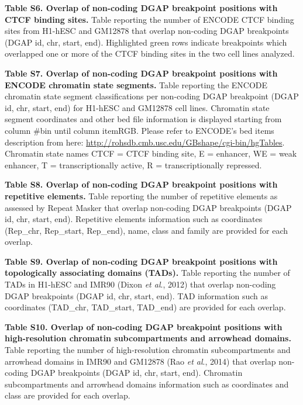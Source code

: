 \documentclass[a4paper,twoside=true,openright,parskip=full,chapterprefix=true,11pt,headings=normal,bibliography=totoc,listof=totoc,titlepage=on,captions=tableabove,draft=false]{scrreprt}
\theoremstyle{definition}
\theoremstyle{definition}
\theoremstyle{definition}
\theoremstyle{remark}
\begin{document}
\textbf{Table S6. Overlap of non-coding DGAP breakpoint positions with
CTCF binding sites.} Table reporting the number of ENCODE CTCF binding
sites from H1-hESC and GM12878 that overlap non-coding DGAP breakpoints
(DGAP id, chr, start, end). Highlighted green rows indicate breakpoints
which overlapped one or more of the CTCF binding sites in the two cell
lines analyzed.

\textbf{Table S7. Overlap of non-coding DGAP breakpoint positions with
ENCODE chromatin state segments.} Table reporting the ENCODE chromatin
state segment classifications per non-coding DGAP breakpoint (DGAP id,
chr, start, end) for H1-hESC and GM12878 cell lines. Chromatin state
segment coordinates and other bed file information is displayed starting
from column \#bin until column itemRGB. Please refer to ENCODE's bed
items description from here:
\url{http://rohsdb.cmb.usc.edu/GBshape/cgi-bin/hgTables}. Chromatin
state names CTCF = CTCF binding site, E = enhancer, WE = weak enhancer,
T = transcriptionally active, R = transcriptionally repressed.

\textbf{Table S8. Overlap of non-coding DGAP breakpoint positions with
repetitive elements.} Table reporting the number of repetitive elements
as assessed by Repeat Masker that overlap non-coding DGAP breakpoints
(DGAP id, chr, start, end). Repetitive elements information such as
coordinates (Rep\_chr, Rep\_start, Rep\_end), name, class and family are
provided for each overlap.

\textbf{Table S9. Overlap of non-coding DGAP breakpoint positions with
topologically associating domains (TADs).} Table reporting the number of
TADs in H1-hESC and IMR90 (Dixon \emph{et al}., 2012) that overlap
non-coding DGAP breakpoints (DGAP id, chr, start, end). TAD information
such as coordinates (TAD\_chr, TAD\_start, TAD\_end) are provided for
each overlap.

\textbf{Table S10. Overlap of non-coding DGAP breakpoint positions with
high-resolution chromatin subcompartments and arrowhead domains.} Table
reporting the number of high-resolution chromatin subcompartments and
arrowhead domains in IMR90 and GM12878 (Rao \emph{et al}., 2014) that
overlap non-coding DGAP breakpoints (DGAP id, chr, start, end).
Chromatin subcompartments and arrowhead domains information such as
coordinates and class are provided for each overlap.
\end{document}
